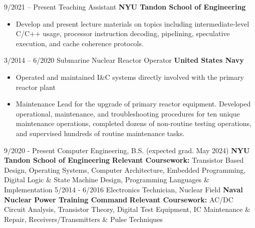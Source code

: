 \documentclass[9pt]{developercv} %
\begin{document}
\vspace{-10 pt}
\begin{entrylist}
	\entry
	{9/2021 -- Present}
	{Teaching Assistant}
	{\textbf{NYU Tandon School of Engineering}}
	{\vspace{-10pt}
		\begin{itemize}[noitemsep,topsep=0pt,parsep=0pt,partopsep=0pt, leftmargin=-1pt]
			\item Develop and present lecture materials on topics including
			      intermediate-level C/C++ usage, processor instruction decoding,
			      pipelining, speculative execution, and cache coherence protocols.
		\end{itemize}
	}
	\entry
	{3/2014 -- 6/2020}
	{Submarine Nuclear Reactor Operator}
	{\textbf{United States Navy}}
	{\vspace{-10pt}
		\begin{itemize}[noitemsep,topsep=0pt,parsep=0pt,partopsep=0pt, leftmargin=-1pt]
			\item Operated and maintained I\&C systems directly involved with the
			      primary reactor plant
			\item Maintenance Lead for the upgrade of primary reactor equipment.
			      Developed operational, maintenance, and troubleshooting procedures
			      for ten unique maintenance operations, completed dozens of
			      non-routine testing operations, and supervised hundreds of
			      routine maintenance tasks.

		\end{itemize}
	}
\end{entrylist}

\vspace{-10 pt}
\begin{entrylist}
	\entry
	{9/2020 - Present}
	{Computer Engineering, B.S. \footnotesize{(expected grad. May 2024)}}
	{\textbf{NYU Tandon School of Engineering}}
	{
		\textbf{Relevant Coursework:} Transistor Based Design, Operating Systems,
		Computer Architecture, Embedded Programming,
		Digital Logic \& State Machine Design,
		Programming Languages \& Implementation
	}
	\entry
	{5/2014 - 6/2016}
	{Electronics Technician, Nuclear Field}
	{\textbf{Naval Nuclear Power Training Command}}
	{
		\textbf{Relevant Coursework:} AC/DC Circuit Analysis, Transistor Theory,
		Digital Test Equipment, IC Maintenance \& Repair, Receivers/Transmitters
		\& Pulse Techniques
	}
\end{entrylist}
\end{document}
